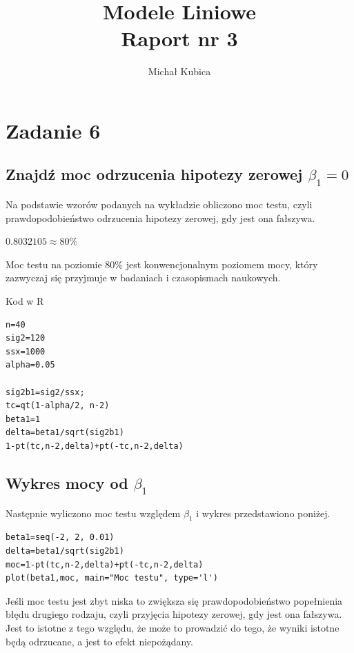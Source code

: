 \documentclass[9pt]{article}  %
\begin{document}
\author{Michał Kubica}
\title{Modele Liniowe \\ Raport nr 3}       
\maketitle                     %

\section{Zadanie 6}            %




  \subsection{Znajdź moc odrzucenia hipotezy zerowej $\beta_1=0$}
  
  Na podstawie wzorów podanych na wykładzie obliczono moc testu, czyli prawdopodobieństwo odrzucenia hipotezy zerowej, gdy jest ona fałszywa.
  
  $0.8032105 \approx 80\% $

  Moc testu na poziomie 80\% jest konwencjonalnym poziomem mocy, który zazwyczaj się przyjmuje w badaniach i czasopismach naukowych.

  Kod w R

    \begin{lstlisting}
n=40
sig2=120 
ssx=1000
alpha=0.05

sig2b1=sig2/ssx;
tc=qt(1-alpha/2, n-2)
beta1=1
delta=beta1/sqrt(sig2b1)
1-pt(tc,n-2,delta)+pt(-tc,n-2,delta)
    \end{lstlisting}  

  \subsection{Wykres mocy od $\beta_1$}

  Następnie wyliczono moc testu względem $\beta_1$ i wykres przedstawiono poniżej.

    \begin{lstlisting}
beta1=seq(-2, 2, 0.01)
delta=beta1/sqrt(sig2b1)
moc=1-pt(tc,n-2,delta)+pt(-tc,n-2,delta)
plot(beta1,moc, main="Moc testu", type='l')
    \end{lstlisting}  
    
    Jeśli moc testu jest zbyt niska to zwiększa się prawdopodobieństwo popełnienia błędu drugiego rodzaju, czyli przyjęcia hipotezy zerowej, gdy jest ona fałszywa. Jest to istotne z tego względu, że może to prowadzić do tego, że wyniki istotne będą odrzucane, a jest to efekt niepożądany.
\end{document}
